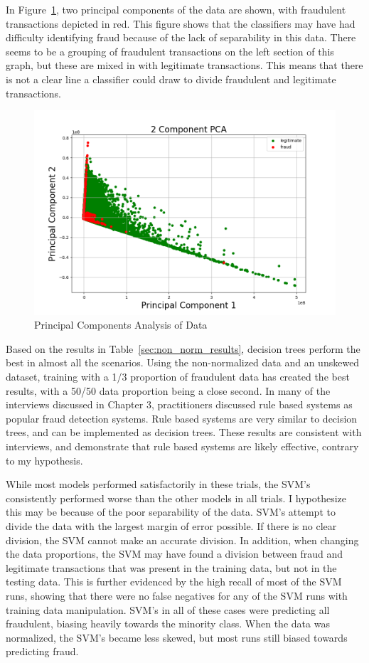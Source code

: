 \documentclass[midd]{thesis}
\begin{document}
In Figure~\ref{fig:data1}, two principal components of the data are shown, with fraudulent transactions depicted in red. This figure shows that the classifiers may have had difficulty identifying fraud because of the lack of separability in this data. There seems to be a grouping of fraudulent transactions on the left section of this graph, but these are mixed in with legitimate transactions. This means that there is not a clear line a classifier could draw to divide fraudulent and legitimate transactions.

\begin{figure} \centering
  \includegraphics[scale=.65]{pca2.png}
  \caption{Principal Components Analysis of Data}
  \label{fig:data1}
\end{figure}

Based on the results in Table~\ref{sec:non_norm_results}, decision trees perform the best in almost all the scenarios. Using the non-normalized data and an unskewed dataset, training with a 1/3 proportion of fraudulent data has created the best results, with a 50/50 data proportion being a close second. In many of the interviews discussed in Chapter 3, practitioners discussed rule based systems as popular fraud detection systems. Rule based systems are very similar to decision trees, and can be implemented as decision trees. These results are consistent with interviews, and demonstrate that rule based systems are likely effective, contrary to my hypothesis. 

While most models performed satisfactorily in these trials, the SVM's consistently performed worse than the other models in all trials. I hypothesize this may be because of the poor separability of the data. SVM's attempt to divide the data with the largest margin of error possible. If there is no clear division, the SVM cannot make an accurate division. In addition, when changing the data proportions, the SVM may have found a division between fraud and legitimate transactions that was present in the training data, but not in the testing data. This is further evidenced by the high recall of most of the SVM runs, showing that there were no false negatives for any of the SVM runs with training data manipulation. SVM's in all of these cases were predicting all fraudulent, biasing heavily towards the minority class. When the data was normalized, the SVM's became less skewed, but most runs still biased towards predicting fraud.
\end{document}
